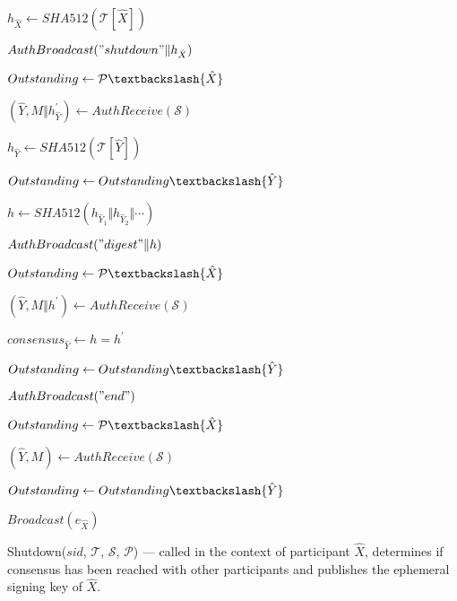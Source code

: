 \begin{algorithm}[H]
  \Begin
  {	
    $h_{\hat{X}} \leftarrow SHA512(\mathcal{T}[\hat{X}])$ 
    
    $AuthBroadcast("shutdown" \Vert h_{\hat{X}})$
    
	$Outstanding \leftarrow \mathcal{P} \textbackslash \{\hat{X}\}$

    {
        $(\hat{Y}, M \Vert h_{\hat{Y}}^{'}) \leftarrow AuthReceive(\mathcal{S})$       
        
        {
          $h_{\hat{Y}} \leftarrow SHA512(\mathcal{T}[\hat{Y}])$
        
          $Outstanding \leftarrow Outstanding \textbackslash \{\hat{Y}\}$
        }
    }
    
    $h \leftarrow SHA512(h_{\hat{Y}_1} \Vert h_{\hat{Y}_2} \Vert \cdots)$
    
    $AuthBroadcast("digest" \Vert h)$
    
    $Outstanding \leftarrow \mathcal{P} \textbackslash \{\hat{X}\}$
    
    {
        $(\hat{Y}, M \Vert h^{'}) \leftarrow AuthReceive(\mathcal{S})$
        
        {
          $consensus_{\hat{Y}} \leftarrow h = h^{'}$
        
          $Outstanding \leftarrow Outstanding \textbackslash \{\hat{Y}\}$
        }
    }
    
    $AuthBroadcast("end")$
    
    $Outstanding \leftarrow \mathcal{P} \textbackslash \{\hat{X}\}$
    
    {
        $(\hat{Y}, M) \leftarrow AuthReceive(\mathcal{S})$
        
        {
          \Return{$\perp$}
        }
        \Else
        {
          $Outstanding \leftarrow Outstanding \textbackslash \{\hat{Y}\}$
        }                       
    }
    
    $Broadcast(e_{\hat{X}})$
    
  }
  \caption{Shutdown($sid$, $\mathcal{T}$, $\mathcal{S}$, $\mathcal{P}$) --- called in the context of participant $\hat{X}$, determines if consensus has been reached with other participants and publishes the ephemeral signing key of $\hat{X}$.}
  \label{algo:shutdown}
\end{algorithm}

